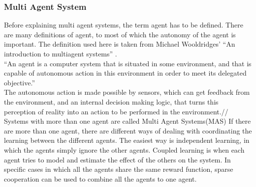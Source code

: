 \documentclass[a4paper]{article}
\begin{document}
\subsubsection{Multi Agent System}
Before explaining multi agent systems, the term agent has to be defined. There are many definitions of agent, to most of which the 
autonomy of the agent is important. The definition used here is taken from Michael Wooldridges' ``An introduction to multiagent systems''
\cite{mas}.\\ 
``An agent is a computer system that is situated in some environment, and that is capable of autonomous action in this environment
in order to meet its delegated objective.'' \\
The autonomous action is made possible by sensors, which can get feedback from the environment, and an internal decision making logic, that 
turns this perception of reality into an action to be performed in the environment.//
Systems with more than one agent are called Multi Agent Systems(MAS)
If there are more than one agent, there are different ways of dealing with coordinating the learning between the
different agents. The easiest way is independent learning, in which the agents simply ignore the other agents. 
Coupled learning is when each agent tries to model and estimate the effect of the others on the system. In specific cases 
in which all the agents share the same reward function, sparse cooperation can be used to combine all the agents to one 
agent.\cite{multiagent}\\

\end{document}
